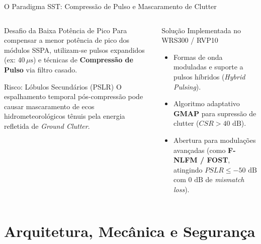 ﻿\documentclass[aspectratio=169]{beamer}
\begin{document}
\begin{frame}{O Paradigma SST: Compress{\~a}o de Pulso e Mascaramento de Clutter}
    \begin{columns}[T]
        \begin{column}{0.48\textwidth}
            \begin{block}{Desafio da Baixa Pot{\^e}ncia de Pico}
                Para compensar a menor pot{\^e}ncia de pico dos m{\'o}dulos SSPA, utilizam-se pulsos expandidos (ex: $40\,\mu\text{s}$) e t{\'e}cnicas de \textbf{Compress{\~a}o de Pulso} via filtro casado.
            \end{block}
            
            \begin{alertblock}{Risco: L{\'o}bulos Secund{\'a}rios (PSLR)}
                O espalhamento temporal p{\'o}s-compress{\~a}o pode causar mascaramento de ecos hidrometeorol{\'o}gicos t{\^e}nuis pela energia refletida de \textit{Ground Clutter}.
            \end{alertblock}
        \end{column}
        
        \begin{column}{0.48\textwidth}
            \begin{exampleblock}{Solu{\c{c}}{\~a}o Implementada no WRS300 / RVP10}
                \begin{itemize}
                    \item Formas de onda moduladas e suporte a pulsos h{\'i}bridos (\textit{Hybrid Pulsing}).
                    \item Algoritmo adaptativo \textbf{GMAP} para supress{\~a}o de clutter ($CSR > 40\text{ dB}$).
                    \item Abertura para modula{\c{c}}{\~o}es avan{\c{c}}adas (como \textbf{F-NLFM / FOST}, atingindo $PSLR \le -50\text{ dB}$ com $0\text{ dB}$ de \textit{mismatch loss}).
                \end{itemize}
            \end{exampleblock}
        \end{column}
    \end{columns}
\end{frame}

\section{Arquitetura, Mec{\^a}nica e Seguran{\c{c}}a}
\end{document}
